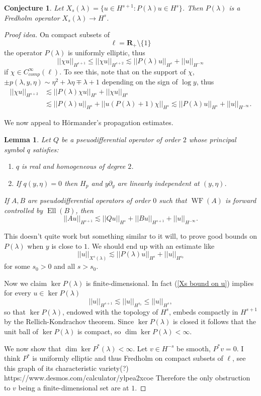 \documentclass[reqno,12pt,letterpaper]{amsart}
\newcommand{\RR}{\mathbf{R}}
\DeclareMathOperator{\Ell}{Ell}
\DeclareMathOperator{\WF}{WF}
\newtheorem{lemma}[theorem]{Lemma}
\newtheorem{conjecture}[theorem]{Conjecture}
\theoremstyle{definition}
\begin{document}
\begin{conjecture}
Let $X_s(\lambda) = \{u \in H^{s+1}: P(\lambda)u \in H^s\}$. Then $P(\lambda)$ is a Fredholm operator $X_s(\lambda) \to H^s$.
\end{conjecture}
\begin{proof}[Proof idea]
On compact subsets of
$$\ell = \RR_+ \setminus \{1\}$$
the operator $P(\lambda)$ is uniformly elliptic, thus
$$||\chi u||_{H^{s+1}} \leq ||\chi u||_{H^{s+2}} \lesssim ||P(\lambda)u||_{H^s} + ||u||_{H^{-\infty}}$$
if $\chi \in C^\infty_{comp}(\ell)$. To see this, note that on the support of $\chi$, $\pm p(\lambda, y, \eta) \sim \eta^2 + \lambda\eta \mp \lambda + 1$ depending on the sign of $\log y$, thus
\begin{align*}||\chi u||_{H^{s+2}} &\lesssim ||P(\lambda)\chi u||_{H^s} + ||\chi u||_{H^s} \\
&\lesssim ||P(\lambda)u||_{H^s} + ||u(P(\lambda) + 1)\chi||_{H^s} \lesssim ||P(\lambda) u||_{H^s} + ||u||_{H^{-\infty}}.
\end{align*}

We now appeal to H\"ormander's propagation estimates.
\begin{lemma}
Let $Q$ be a pseuodifferential operator of order $2$ whose principal symbol $q$ satisfies:
\begin{enumerate}
\item $q$ is real and homogeneous of degree $2$.
\item If $q(y, \eta) = 0$ then $H_p$ and $y\partial_y$ are linearly independent at $(y, \eta)$.
\end{enumerate}
If $A,B$ are pseudodifferential operators of order $0$ such that $\WF(A)$ is forward controlled by $\Ell(B)$, then
$$||Au||_{H^{s+1}} \lesssim ||Qu||_{H^s} + ||Bu||_{H^{s+1}} + ||u||_{H^{-\infty}}.$$
\end{lemma}
This doesn't quite work but something similar to it will, to prove good bounds on $P(\lambda)$ when $y$ is close to $1$.
We should end up with an estimate like
\begin{equation}
\label{Xs bound on u}
||u||_{X^s(\lambda)} \lesssim ||P(\lambda)u||_{H^s} + ||u||_{H^{s_0}}
\end{equation}
for some $s_0 > 0$ and all $s > s_0$.

Now we claim $\ker P(\lambda)$ is finite-dimensional. In fact (\ref{Xs bound on u}) implies for every $u \in \ker P(\lambda)$
$$||u||_{H^{s+1}} \lesssim ||u||_{H^{s_0}} \leq ||u||_{H^s},$$
so that $\ker P(\lambda)$, endowed with the topology of $H^s$, embeds compactly in $H^{s+1}$ by the Rellich-Kondrachov theorem. Since $\ker P(\lambda)$ is closed it follows that the unit ball of $\ker P(\lambda)$ is compact, so $\dim \ker P(\lambda) < \infty$.

We now show that $\dim \ker P^*(\lambda) < \infty$. Let $v \in H^{-s}$ be smooth, $P^*v = 0$.
I think $P^*$ is uniformly elliptic and thus Fredholm on compact subsets of $\ell$, see this graph of its characteristic variety(?) https://www.desmos.com/calculator/ylpea2xcoe
Therefore the only obstruction to $v$ being a finite-dimensional set are at $1$.
\end{proof}


\printbibliography
\end{document}
